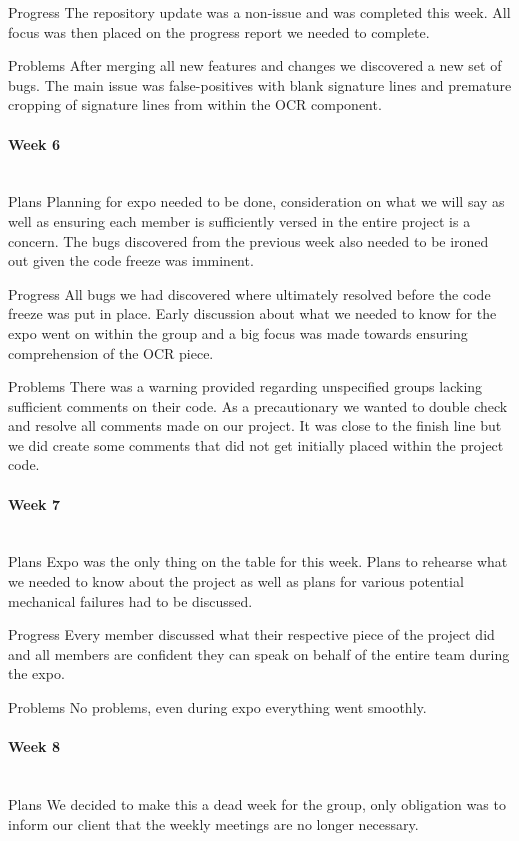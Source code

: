 \documentclass[article, onecolumn, draftclsnofoot,10pt, compsoc]{IEEEtran}
\begin{document}
Progress
The repository update was a non-issue and was completed this week. All focus was then placed on the progress report we needed to complete.
 
Problems
After merging all new features and changes we discovered a new set of bugs. The main issue was false-positives with blank signature lines and premature cropping of signature lines from within the OCR component.

\paragraph{Week 6}
\mbox{}\\
Plans
Planning for expo needed to be done, consideration on what we will say as well as ensuring each member is sufficiently versed in the entire project is a concern. The bugs discovered from the previous week also needed to be ironed out given the code freeze was imminent. 
 
Progress
All bugs we had discovered where ultimately resolved before the code freeze was put in place. Early discussion about what we needed to know for the expo went on within the group and a big focus was made towards ensuring comprehension of the OCR piece.
 
Problems
There was a warning provided regarding unspecified groups lacking sufficient comments on their code. As a precautionary we wanted to double check and resolve all comments made on our project. It was close to the finish line but we did create some comments that did not get initially placed within the project code. 

\paragraph{Week 7}
\mbox{}\\
Plans
Expo was the only thing on the table for this week. Plans to rehearse what we needed to know about the project as well as plans for various potential mechanical failures had to be discussed.
 
Progress
Every member discussed what their respective piece of the project did and all members are confident they can speak on behalf of the entire team during the expo.
 
Problems
No problems, even during expo everything went smoothly.

\paragraph{Week 8}
\mbox{}\\
Plans
We decided to make this a dead week for the group, only obligation was to inform our client that the weekly meetings are no longer necessary.
 
\end{document}
